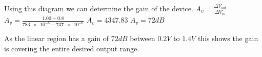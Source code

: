 Using this diagram we can determine the gain of the device.
$A_{v} = \frac{\Delta V_{out}}{\Delta V_{in}}$ \\
$A_{v} = \frac{1.00 - 0.8}{\num{783e-6} - \num{737e-6}}$
$A_{v} = 4347.83$
$A_{v} = 72dB$

As the linear region has a gain of $72dB$ between $0.2V$ to $1.4V$ this shows the gain is covering the entire desired output range.
